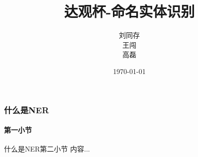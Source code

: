 \documentclass{beamer}
\title{达观杯-命名实体识别}
\author{刘同存\\王闯\\高磊}
\institute{北京邮电大学\\东信北邮}
\date{\today}
\begin{document}
	\begin{frame}
		\titlepage
	\end{frame}
	\begin{frame}
		\frametitle{什么是NER}
		\framesubtitle{第一小节}
	\end{frame}

	\begin{frame}{什么是NER}{第二小节}
		内容...
	\end{frame}
\end{document}
